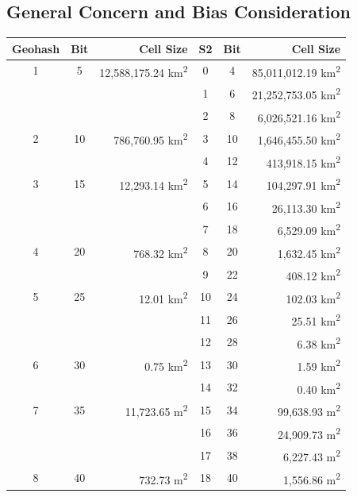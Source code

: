 \subsection{General Concern and Bias Consideration} \label{Results-TechniqueComparison-Concern}

\begin{table}[htb!]
  \centering
  \begin{tabular}{|c|c|r||c|c|r|}
    \hline
    \textbf{Geohash} & Bit & Cell Size & \textbf{S2} & Bit & Cell Size \\
    \hline
    1 & 5 & 12,588,175.24 km\textsuperscript{2} & 0 & 4 & 85,011,012.19 km\textsuperscript{2} \\
    & & & 1 & 6 & 21,252,753.05 km\textsuperscript{2} \\
    & & & 2 & 8 & 6,026,521.16 km\textsuperscript{2} \\
    2 & 10 & 786,760.95 km\textsuperscript{2} & 3 & 10 & 1,646,455.50 km\textsuperscript{2} \\
    & & & 4 & 12 & 413,918.15 km\textsuperscript{2} \\
    3 & 15 & 12,293.14 km\textsuperscript{2} & 5 & 14 & 104,297.91 km\textsuperscript{2} \\
    & & & 6 & 16 & 26,113.30 km\textsuperscript{2} \\
    & & & 7 & 18 & 6,529.09 km\textsuperscript{2} \\
    4 & 20 & 768.32 km\textsuperscript{2} & 8 & 20 & 1,632.45 km\textsuperscript{2} \\
    & & & 9 & 22 & 408.12 km\textsuperscript{2} \\
    5 & 25 & 12.01 km\textsuperscript{2} & 10 & 24 & 102.03 km\textsuperscript{2} \\
    & & & 11 & 26 & 25.51 km\textsuperscript{2} \\
    & & & 12 & 28 & 6.38 km\textsuperscript{2} \\
    6 & 30 & 0.75 km\textsuperscript{2} & 13 & 30 & 1.59 km\textsuperscript{2} \\
    & & & 14 & 32 & 0.40 km\textsuperscript{2} \\
    7 & 35 & 11,723.65 m\textsuperscript{2} & 15 & 34 & 99,638.93 m\textsuperscript{2} \\
    & & & 16 & 36 & 24,909.73 m\textsuperscript{2} \\
    & & & 17 & 38 & 6,227.43 m\textsuperscript{2} \\
    8 & 40 & 732.73 m\textsuperscript{2} & 18 & 40 & 1,556.86 m\textsuperscript{2} \\

\end{tabular}
\end{table}
